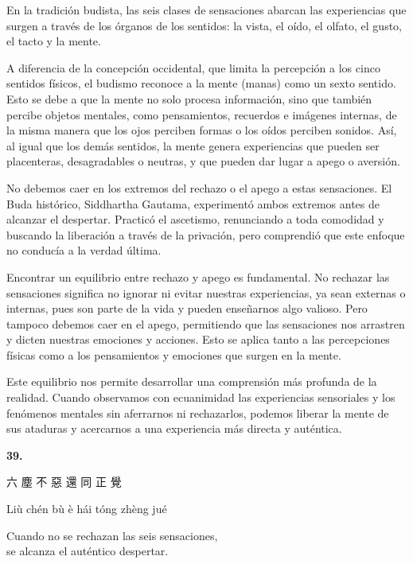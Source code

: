 \documentclass[
  a5paperpaper,
]{article}
\begin{document}
En la tradición budista, las seis clases de sensaciones abarcan las
experiencias que surgen a través de los órganos de los sentidos: la
vista, el oído, el olfato, el gusto, el tacto y la mente.

A diferencia de la concepción occidental, que limita la percepción a los
cinco sentidos físicos, el budismo reconoce a la mente (manas) como un
sexto sentido. Esto se debe a que la mente no solo procesa información,
sino que también percibe objetos mentales, como pensamientos, recuerdos
e imágenes internas, de la misma manera que los ojos perciben formas o
los oídos perciben sonidos. Así, al igual que los demás sentidos, la
mente genera experiencias que pueden ser placenteras, desagradables o
neutras, y que pueden dar lugar a apego o aversión.

No debemos caer en los extremos del rechazo o el apego a estas
sensaciones. El Buda histórico, Siddhartha Gautama, experimentó ambos
extremos antes de alcanzar el despertar. Practicó el ascetismo,
renunciando a toda comodidad y buscando la liberación a través de la
privación, pero comprendió que este enfoque no conducía a la verdad
última.

Encontrar un equilibrio entre rechazo y apego es fundamental. No
rechazar las sensaciones significa no ignorar ni evitar nuestras
experiencias, ya sean externas o internas, pues son parte de la vida y
pueden enseñarnos algo valioso. Pero tampoco debemos caer en el apego,
permitiendo que las sensaciones nos arrastren y dicten nuestras
emociones y acciones. Esto se aplica tanto a las percepciones físicas
como a los pensamientos y emociones que surgen en la mente.

Este equilibrio nos permite desarrollar una comprensión más profunda de
la realidad. Cuando observamos con ecuanimidad las experiencias
sensoriales y los fenómenos mentales sin aferrarnos ni rechazarlos,
podemos liberar la mente de sus ataduras y acercarnos a una experiencia
más directa y auténtica.

\hfill\break

\hypertarget{04}{}
\begin{verseblock}

\newpage

\begin{center}\textbf{39.}\end{center}

六 塵 不 惡 還 同 正 覺

Liù chén bù è hái tóng zhèng jué

Cuando no se rechazan las seis sensaciones,\\
se alcanza el auténtico despertar.

\end{verseblock}
\end{document}
